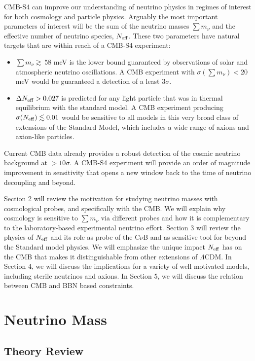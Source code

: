 CMB-S4 can improve our understanding of neutrino physics in regimes of interest for both cosmology and particle physics.  Arguably the most important parameters of interest will be the sum of the neutrino masses $\sum m_\nu$ and the effective number of neutrino species, $N_{\rm eff}$.  These two parameters have natural targets that are within reach of a CMB-S4 experiment:
\begin{itemize}
\item $ \sum m_\nu \gtrsim \, 58$ meV is the lower bound guaranteed by observations of solar and atmospheric neutrino oscillations.  A CMB experiment with $\sigma(\sum m_\nu) < 20$ meV would be guaranteed a detection of a least 3$\sigma$.
\item $\Delta N_{\rm eff} >  0.027$ is predicted for any light particle that was in thermal equilibrium with the standard model.  A CMB experiment producing $\sigma(N_{\rm eff}) \lesssim 0.01$ would be sensitive to all models in this very broad class of extensions of the Standard Model, which includes a wide range of axions and axion-like particles.  
\end{itemize}
Current CMB data already provides a robust detection of the cosmic neutrino background at $>10 \sigma$.  A CMB-S4 experiment will provide an order of magnitude improvement in sensitivity that opens a new window back to the time of neutrino decoupling and beyond.

Section 2 will review the motivation for studying neutrino masses with cosmological probes, and specifically with the CMB.  We will explain why cosmology is sensitive to $\sum m_\nu$ via different probes and how it is complementary to the laboratory-based experimental neutrino effort.  Section 3 will review the physics of $N_{\rm eff}$ and its role as probe of the C$\nu$B and as sensitive tool for beyond the Standard model physics.  We will emphasize the unique impact $N_{\rm eff}$ has on the CMB that makes it distinguishable from other extensions of $\Lambda$CDM.  In Section 4, we will discuss the implications for a variety of well motivated models, including sterile neutrinos and axions.  In Section 5, we will discuss the relation between CMB and BBN based constraints.  

\section{Neutrino Mass}

\subsection{Theory Review}

